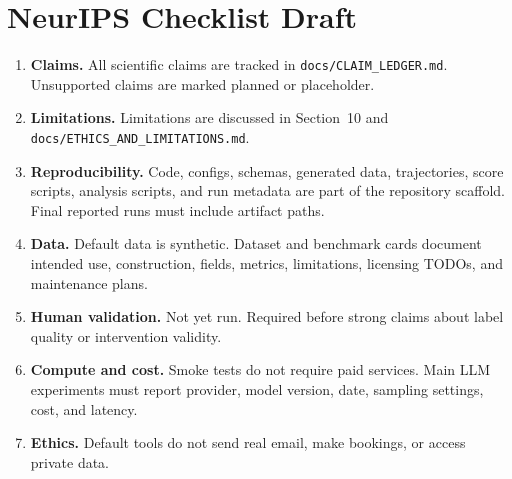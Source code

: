 \section*{NeurIPS Checklist Draft}

\begin{enumerate}[leftmargin=*]
    \item \textbf{Claims.} All scientific claims are tracked in \texttt{docs/CLAIM\_LEDGER.md}. Unsupported claims are marked planned or placeholder.
    \item \textbf{Limitations.} Limitations are discussed in Section~10 and \texttt{docs/ETHICS\_AND\_LIMITATIONS.md}.
    \item \textbf{Reproducibility.} Code, configs, schemas, generated data, trajectories, score scripts, analysis scripts, and run metadata are part of the repository scaffold. Final reported runs must include artifact paths.
    \item \textbf{Data.} Default data is synthetic. Dataset and benchmark cards document intended use, construction, fields, metrics, limitations, licensing TODOs, and maintenance plans.
    \item \textbf{Human validation.} Not yet run. Required before strong claims about label quality or intervention validity.
    \item \textbf{Compute and cost.} Smoke tests do not require paid services. Main LLM experiments must report provider, model version, date, sampling settings, cost, and latency.
    \item \textbf{Ethics.} Default tools do not send real email, make bookings, or access private data.
\end{enumerate}
